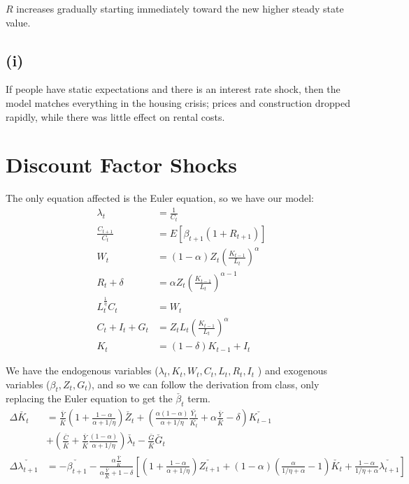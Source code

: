 \documentclass[11pt]{amsart}
\begin{document}
$R$ increases gradually starting immediately toward the new higher steady state value.

\subsection*{(i)}

If people have static expectations and there is an interest rate shock, then the model matches everything in the housing crisis; prices and construction dropped rapidly, while there was little effect on rental costs.

\section{Discount Factor Shocks}

The only equation affected is the Euler equation, so we have our model:
\begin{align*}
\lambda_t &= \frac{1}{C_t} \\
\frac{C_{t+1}}{C_t} &=  E[\beta_{t+1} (1+ R_{t+1})]\\
W_t &= (1-\alpha) Z_t \left( \frac{K_{t-1}}{L_t} \right)^\alpha \\
R_t + \delta & = \alpha Z_t \left( \frac{K_{t-1}}{L_t} \right)^{\alpha-1} \\
L_t^{\frac{1}{\eta}} C_t &= W_t \\
C_t + I_t + G_t &= Z_t L_t \left(\frac{K_{t-1}}{L_t} \right)^\alpha \\
K_t &= (1-\delta) K_{t-1} + I_t
\end{align*}

We have the endogenous variables ($\lambda_t, K_t, W_t, C_t, L_t, R_t, I_t$ ) and exogenous variables ($\beta_t, Z_t, G_t)$, and so we can follow the derivation from class, only replacing the Euler equation to get the $\check{\beta_t}$ term.
\begin{align*}
\Delta \check{K_t} &= \frac{\bar{Y}}{\bar{K}} \left( 1 + \frac{1-\alpha}{\alpha + 1/\eta} \right) \check{Z_t} + \left( \frac{\alpha (1-\alpha )}{\alpha + 1/\eta}  \frac{\bar{Y_t}}{\bar{K_t}}  + \alpha \frac{\bar{Y}}{\bar{K}} - \delta  \right) \check{K_{t-1}}  \\
&+ \left( \frac{\bar{C}}{\bar{K}} + \frac{\bar{Y}}{\bar{K}} \frac{(1-\alpha)}{\alpha + 1/\eta}\right) \check{\lambda_t} - \frac{\bar{G}}{\bar{K}}\check{G_t} \\
\Delta \check{\lambda_{t+1}}  &=  - \check{\beta_{t+1}} - \frac{\alpha \frac{\bar{Y}}{\bar{K}}}{\alpha \frac{\bar{Y}}{\bar{K}} + 1 - \delta} \left[   \left( 1 + \frac{1-\alpha}{\alpha + 1/\eta} \right) \check{Z_{t+1}} + (1-\alpha) \left( \frac{\alpha}{1/\eta + \alpha} -1 \right) \check{K_t} + \frac{1-\alpha}{1/\eta + \alpha} \check{\lambda_{t+1}}  \right]
\end{align*}
\end{document}
